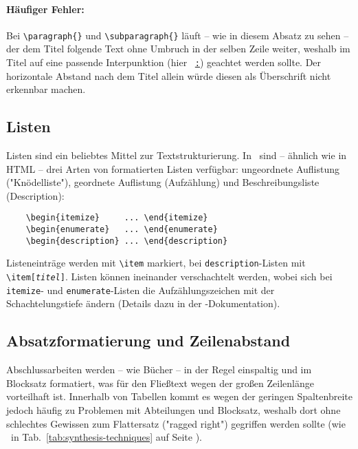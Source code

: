 \paragraph{Häufiger Fehler:} Bei \verb!\paragraph{}! und \verb!\subparagraph{}!
läuft -- wie in diesem Absatz zu sehen -- der dem Titel folgende Text ohne
Umbruch in der selben Zeile weiter, weshalb im Titel auf eine passende
Interpunktion (hier \zB\ \underline{\texttt{:}}) geachtet werden sollte. Der
horizontale Abstand nach dem Titel allein würde diesen als Überschrift nicht
erkennbar machen.

\subsection{Listen}

Listen sind ein beliebtes Mittel zur Textstrukturierung. In \latex\ sind --
ähnlich wie in HTML -- drei Arten von formatierten Listen verfügbar:
ungeordnete Auflistung ("Knödelliste"), geordnete Auflistung (Aufzählung) und
Beschreibungsliste (Description):
%
\begin{verbatim}
    \begin{itemize}     ... \end{itemize}
    \begin{enumerate}   ... \end{enumerate}
    \begin{description} ... \end{description}
\end{verbatim}
%
Listeneinträge werden mit \verb!\item! markiert, bei
\texttt{description}-Listen mit \verb!\item[!\texttt{\em titel}\verb!]!.
Listen können ineinander verschachtelt werden, wobei sich bei \texttt{itemize}-
und \texttt{enumerate}-Listen die Aufzählungszeichen mit der Schachtelungstiefe
ändern (Details dazu in der \latex-Dokumentation).

\subsection{Absatzformatierung und Zeilenabstand}

Abschlussarbeiten werden -- wie Bücher -- in der Regel einspaltig und im
Blocksatz formatiert, was für den Fließtext wegen der großen Zeilenlänge
vorteilhaft ist. Innerhalb von Tabellen kommt es wegen der geringen
Spaltenbreite jedoch häufig zu Problemen mit Abteilungen und Blocksatz,
weshalb dort ohne schlechtes Gewissen zum Flattersatz ("ragged right")
gegriffen werden sollte (wie \zB\ in Tab.~\ref{tab:synthesis-techniques} auf
Seite \pageref{tab:synthesis-techniques}).

